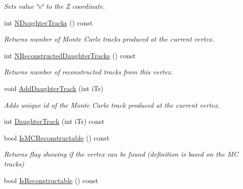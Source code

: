 \begin{DoxyCompactItemize}
\begin{DoxyCompactList}\small\item\em Sets value \char`\"{}v\char`\"{} to the Z coordinate. \end{DoxyCompactList}\item 
int \hyperlink{classKFMCVertex_a51f3aafb24777a594684b2222769c8ee}{N\+Daughter\+Tracks} () const \hypertarget{classKFMCVertex_a51f3aafb24777a594684b2222769c8ee}{}\label{classKFMCVertex_a51f3aafb24777a594684b2222769c8ee}

\begin{DoxyCompactList}\small\item\em Returns number of Monte Carlo tracks produced at the current vertex. \end{DoxyCompactList}\item 
int \hyperlink{classKFMCVertex_a9e34c5cc68180b40c0a9c59e2408fd7e}{N\+Reconstructed\+Daughter\+Tracks} () const \hypertarget{classKFMCVertex_a9e34c5cc68180b40c0a9c59e2408fd7e}{}\label{classKFMCVertex_a9e34c5cc68180b40c0a9c59e2408fd7e}

\begin{DoxyCompactList}\small\item\em Returns number of reconstructed tracks from this vertex. \end{DoxyCompactList}\item 
void \hyperlink{classKFMCVertex_af2ccf2a07c048d97a40539482275e12a}{Add\+Daughter\+Track} (int i\+Tr)\hypertarget{classKFMCVertex_af2ccf2a07c048d97a40539482275e12a}{}\label{classKFMCVertex_af2ccf2a07c048d97a40539482275e12a}

\begin{DoxyCompactList}\small\item\em Adds unique id of the Monte Carlo track produced at the current vertex. \end{DoxyCompactList}\item 
int \hyperlink{classKFMCVertex_a8952b674a23b479a1ed642dcf8db3856}{Daughter\+Track} (int i\+Tr) const 
\item 
bool \hyperlink{classKFMCVertex_a87f06d29c10c29e62e62faea55cebdf9}{Is\+M\+C\+Reconstructable} () const \hypertarget{classKFMCVertex_a87f06d29c10c29e62e62faea55cebdf9}{}\label{classKFMCVertex_a87f06d29c10c29e62e62faea55cebdf9}

\begin{DoxyCompactList}\small\item\em Returns flag showing if the vertex can be found (definition is based on the MC tracks) \end{DoxyCompactList}\item 
bool \hyperlink{classKFMCVertex_a41a15930645f6801706e46d5c5c92497}{Is\+Reconstructable} () const \hypertarget{classKFMCVertex_a41a15930645f6801706e46d5c5c92497}{}\label{classKFMCVertex_a41a15930645f6801706e46d5c5c92497}


\end{DoxyCompactItemize}
